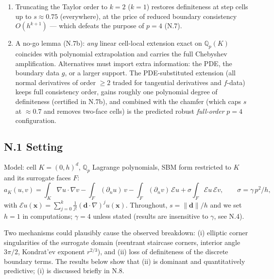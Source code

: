 \begin{enumerate}
        triangle is thin in the extrapolation direction, which eats part
        of the benefit (N.6).
  \item Truncating the Taylor order to $k=2$ ($k=1$) restores definiteness
        at step cells up to $s \approx 0.75$ (everywhere), at the price of
        reduced boundary consistency $O(h^{k+1})$ --- which defeats the
        purpose of $p=4$ (N.7).
  \item A no-go lemma (N.7b): \emph{any} linear cell-local extension exact
        on $\mathbb Q_p(K)$ coincides with polynomial extrapolation and
        carries the full Chebyshev amplification. Alternatives must import
        extra information: the PDE, the boundary data $g$, or a larger
        support. The PDE-substituted extension (all normal derivatives of
        order $\ge 2$ traded for tangential derivatives and $f$-data)
        keeps full consistency order, gains roughly one polynomial degree
        of definiteness (certified in N.7b), and combined with the chamfer
        (which caps $s$ at $\approx 0.7$ and removes two-face cells) is
        the predicted robust \emph{full-order} $p=4$ configuration.
\end{enumerate}

\subsection*{N.1 Setting}

Model: cell $K = (0,h)^d$, $\mathbb Q_p$ Lagrange polynomials, SBM form
restricted to $K$ and its surrogate faces $F$:
\begin{equation}
  a_K(u,v) = \int_K \nabla u\cdot\nabla v
  - \int_F (\partial_n u)\, v
  - \int_F (\partial_n v)\, \mathcal E u
  + \sigma \int_F \mathcal E u\, \mathcal E v,
  \qquad \sigma = \gamma\, p^2/h,
  \label{eq:cellform}
\end{equation}
with $\mathcal E u(\mathbf x) = \sum_{j=0}^{k} \tfrac1{j!} (\mathbf
d\cdot\nabla)^j u(\mathbf x)$. Throughout, $s = \|\mathbf d\|/h$ and we set
$h=1$ in computations; $\gamma = 4$ unless stated (results are insensitive
to $\gamma$, see N.4).

Two mechanisms could plausibly cause the observed breakdown: (i) elliptic
corner singularities of the surrogate domain (reentrant staircase corners,
interior angle $3\pi/2$, Kondrat'ev exponent $r^{2/3}$), and (ii) loss of
definiteness of the discrete boundary terms. The results below show that
(ii) is dominant and quantitatively predictive; (i) is discussed briefly in
N.8.

